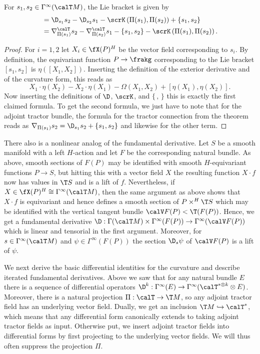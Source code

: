  \begin{cor}\label{cor 1.5.8 Cap}
    For $s_1,s_2\in\Gamma^\infty(\calT M)$, the Lie bracket is given by 
    \begin{align}
        [s_1,s_2]&=\D_{s_1}s_2-\D_{s_2}s_1 -\scrK\left(\Pi(s_1),\Pi(s_2)\right)+\{s_1,s_2\}\\
        &=\nabla^{\calT}_{\Pi(s_1)}s_2-\nabla^\calT_{\Pi(s_2)}s_1-\{s_1,s_2\}-\scrK\left(\Pi(s_1),\Pi(s_2)\right).
    \end{align}
 \end{cor}
 \begin{proof}
    For $i=1,2$ let $X_i\in\fX(P)^H$ be the vector field corresponding to $s_i$. By definition, the equivariant function $P\to\frakg$ corresponding to the Lie bracket $[s_1,s_2]$ is $\eta([X_1,X_2])$. Inserting the definition of the exterior derivative and of the curvature form, this reads as 
    \[X_1\cdot\eta(X_2)-X_2\cdot\eta(X_1)-\Omega(X_1,X_2)+[\eta(X_1),\eta(X_2)].\]
    Now inserting the definitions of $\D$, $\scrK$, and $\{\,,\,\}$ this is exactly the first claimed formula. To get the second formula, we just have to note that for the adjoint tractor bundle, the formula for the tractor connection from the theorem reads as $\nabla_{\Pi(s_1)}s_2=\D_{s_1}s_2+\{s_1,s_2\}$ and likewise for the other term.
 \end{proof}

 \begin{rem}
    There also is a nonlinear analog of the fundamental derivative. Let $S$ be a smooth manifold with a left $H$-action and let $F$ be the corresponding natural bundle. As above, smooth sections of $F(P)$ may be identified with smooth $H$-equivariant functions $P\to S$, but hitting this with a vector field $X$ the resulting function $X\cdot f$ now has values in $\T S$ and is a lift of $f$. Nevertheless, if $X\in\fX(P)^H\cong \Gamma^\infty(\calT M)$, then the same argument as above shows that $X\cdot f$ is equivariant and hence defines a smooth section of $P\times^{H} \T S$ which may be identified with the vertical tangent bundle $\calV F(P)<\T (F(P))$. Hence, we get a fundamental derivative $\D:\Gamma(\calT M)\times\Gamma^\infty(F(P))\to \Gamma^\infty(\calV F(P))$ which is linear and tensorial in the first argument. Moreover, for $s\in\Gamma^\infty(\calT M)$ and $\psi\in \Gamma^\infty(F(P))$ the section $\D_s\psi$ of $\calV F(P)$ is a lift of $\psi$.
 \end{rem}

 We next derive the basic differential identities for the curvature and describe iterated fundamental derivatives. Above we saw that for any natural bundle $E$ there is a sequence of differential operators $\D^k:\Gamma^\infty(E)\to \Gamma^\infty(\calT^{\ast\otimes k}\otimes E)$. Moreover, there is a natural projection $\Pi:\calT\to \T M$, so any adjoint tractor field has an underlying vector field. Dually, we get an inclusion $\T M\hookrightarrow \calT^\ast$, which means that any differential form canonically extends to taking adjoint tractor fields as input. Otherwise put, we insert adjoint tractor fields into differential forms by first projecting to the underlying vector fields. We will thus often suppress the projection $\Pi$.

